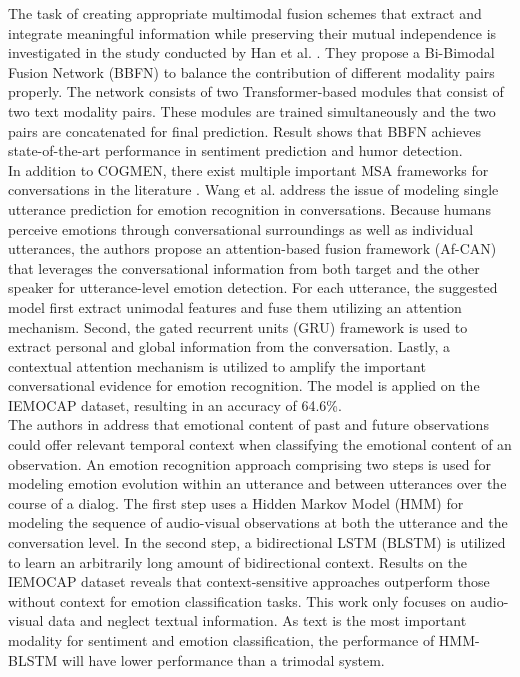 The task of creating appropriate multimodal fusion schemes that extract and integrate meaningful information while preserving their mutual independence is investigated in the study conducted by Han et al. \cite{bimodal-fusion1-10.1145/3462244.3479919}. They propose a Bi-Bimodal Fusion Network (BBFN) to balance the contribution of different modality pairs properly. The network consists of two Transformer-based modules that consist of two text modality pairs. These modules are trained simultaneously and the two pairs are concatenated for final prediction. Result shows that BBFN achieves state-of-the-art performance in sentiment prediction and humor detection. \\

In addition to COGMEN, there exist multiple important MSA frameworks for conversations in the literature \cite{HP_Advanced}. Wang et al. \cite{Af-CAN_2021} address the issue of modeling single utterance prediction for emotion recognition in conversations. Because humans perceive emotions through conversational surroundings as well as individual utterances, the authors propose an attention-based fusion framework (Af-CAN) that leverages the conversational information from both target and the other speaker for utterance-level emotion detection. For each utterance, the suggested model first extract unimodal features and fuse them utilizing an attention mechanism. Second, the gated recurrent units (GRU) framework is used to extract personal and global information from the conversation. Lastly, a contextual attention mechanism is utilized to amplify the important conversational evidence for emotion recognition. The model is applied on the IEMOCAP dataset, resulting in an accuracy of 64.6\%. \\

The authors in \cite{model_based_fusion6122012} address that emotional content of past and future observations could offer relevant temporal context when classifying the emotional content of an observation. An emotion recognition approach comprising two steps is used for modeling emotion evolution within an utterance and between utterances over the course of a dialog. The first step uses a Hidden Markov Model (HMM) for modeling the sequence of audio-visual observations at both the utterance and the conversation level. In the second step, a bidirectional LSTM (BLSTM) is utilized to learn an arbitrarily long amount of bidirectional context. Results on the IEMOCAP dataset reveals that context-sensitive approaches outperform those without context for emotion classification tasks. This work only focuses on audio-visual data and neglect textual information. As text is the most important modality for sentiment and emotion classification, the performance of HMM-BLSTM will have lower performance than a trimodal system. \\

